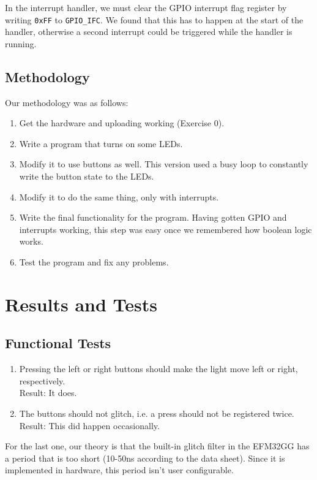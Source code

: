 \documentclass[a4paper, 12pt]{article}
\begin{document}
        In the interrupt handler, we must clear the GPIO interrupt flag register by writing \texttt{0xFF} to \texttt{GPIO\_IFC}. We found that this has to happen at the start of the handler, otherwise a second interrupt could be triggered while the handler is running.

    \subsection{Methodology} %
    \label{sub:methodology}
        Our methodology was as follows:
        \begin{enumerate}
            \item Get the hardware and uploading working (Exercise 0).
            \item Write a program that turns on some LEDs.
            \item Modify it to use buttons as well. This version used a busy loop to constantly write the button state to the LEDs.
            \item Modify it to do the same thing, only with interrupts.
            \item Write the final functionality for the program. Having gotten GPIO and interrupts working, this step was easy once we remembered how boolean logic works.
            \item Test the program and fix any problems.
        \end{enumerate}

\section{Results and Tests} %
\label{sec:results_and_tests}
	\subsection{Functional Tests} %
	\label{sub:functional_tests}
		\begin{enumerate}
			\item Pressing the left or right buttons should make the light move left or right, respectively. \\
				  Result: It does.
			\item The buttons should not glitch, i.e. a press should not be registered twice.\\
				  Result: This did happen occasionally.
		\end{enumerate}
		For the last one, our theory is that the built-in glitch filter in the EFM32GG has a period that is too short (10-50ns according to the data sheet). Since it is implemented in hardware, this period isn't user configurable.
\end{document}
